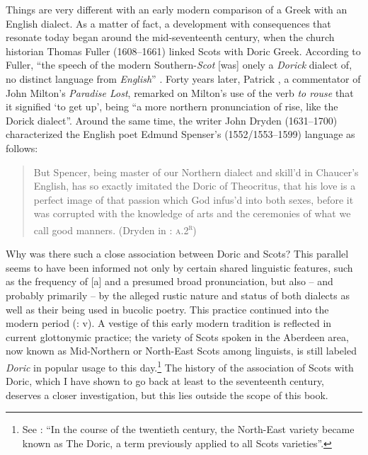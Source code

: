 Things are very different with an early modern comparison of a Greek with an English dialect. As a matter of fact, a development with consequences that resonate today began around the mid-seventeenth century, when the church historian Thomas Fuller (1608–1661) linked Scots with Doric Greek. According to Fuller, “the speech of the modern Southern-\textit{Scot} [was] onely a \textit{Dorick} dialect of, no distinct language from \textit{English}” \citep[81]{Fuller1655}. Forty years later, Patrick \citet[20]{Hume1695}, a commentator of John Milton’s \textit{Paradise Lost}, remarked on Milton’s use of the verb \textit{to rouse} that it signified ‘to get up’, being “a more northern pronunciation of rise, like the Dorick dialect”. Around the same time, the writer John Dryden (1631–1700) characterized the English poet Edmund Spenser’s (1552/1553–1599) language as follows:

\begin{quote}
But Spencer, being master of our Northern dialect and skill’d in Chaucer’s English, has so exactly imitated the Doric of Theocritus, that his love is a perfect image of that passion which God infus’d into both sexes, before it was corrupted with the knowledge of arts and the ceremonies of what we call good manners. (Dryden in \citealt{Virgil1697}: \textsc{a.2}\textsc{\textsuperscript{r}})
\end{quote}

Why was there such a close association between Doric and Scots? This parallel seems to have been informed not only by certain shared linguistic features, such as the frequency of [a] and a presumed broad pronunciation, but also – and probably primarily – by the alleged rustic nature and status of both dialects as well as their being used in bucolic poetry. This practice continued into the modern period (\citealt{Colvin1999}: v). A vestige of this early modern tradition is reflected in current glottonymic practice; the variety of Scots spoken in the Aberdeen area, now known as Mid-Northern or North-East Scots among linguists, is still labeled \textit{Doric} in popular usage to this day.\footnote{See \citet[116]{Mccoll2007}: “In the course of the twentieth century, the North-East variety became known as The Doric, a term previously applied to all Scots varieties”.} The history of the association of Scots with Doric, which I have shown to go back at least to the seventeenth century, deserves a closer investigation, but this lies outside the scope of this book.

